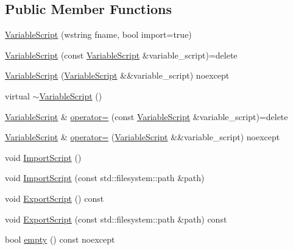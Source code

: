 \subsection*{Public Member Functions}
\begin{DoxyCompactItemize}
\item 
\mbox{\hyperlink{classmage_1_1_variable_script_a87830f09a97aa8f7df3074029c5ab8d5}{Variable\+Script}} (wstring fname, bool import=true)
\item 
\mbox{\hyperlink{classmage_1_1_variable_script_aebd4e6cf2bdae4e57c9da428007fc4d7}{Variable\+Script}} (const \mbox{\hyperlink{classmage_1_1_variable_script}{Variable\+Script}} \&variable\+\_\+script)=delete
\item 
\mbox{\hyperlink{classmage_1_1_variable_script_ac29cca638a32bccae00a9e53404158d5}{Variable\+Script}} (\mbox{\hyperlink{classmage_1_1_variable_script}{Variable\+Script}} \&\&variable\+\_\+script) noexcept
\item 
virtual \mbox{\hyperlink{classmage_1_1_variable_script_ae7026e1283b1a1164f02fdc3e1f2b829}{$\sim$\+Variable\+Script}} ()
\item 
\mbox{\hyperlink{classmage_1_1_variable_script}{Variable\+Script}} \& \mbox{\hyperlink{classmage_1_1_variable_script_ae090b066ea939fc6611e77a47df6a97f}{operator=}} (const \mbox{\hyperlink{classmage_1_1_variable_script}{Variable\+Script}} \&variable\+\_\+script)=delete
\item 
\mbox{\hyperlink{classmage_1_1_variable_script}{Variable\+Script}} \& \mbox{\hyperlink{classmage_1_1_variable_script_a7cb6a585a701268aaac38d8f039fc403}{operator=}} (\mbox{\hyperlink{classmage_1_1_variable_script}{Variable\+Script}} \&\&variable\+\_\+script) noexcept
\item 
void \mbox{\hyperlink{classmage_1_1_variable_script_a5f1cc3bfb611edbc8dfb433ec55cc965}{Import\+Script}} ()
\item 
void \mbox{\hyperlink{classmage_1_1_variable_script_aea1a4abf7c439897b9ac332896709c93}{Import\+Script}} (const std\+::filesystem\+::path \&path)
\item 
void \mbox{\hyperlink{classmage_1_1_variable_script_ab12b7f789f6af2b301ff350fa401b324}{Export\+Script}} () const
\item 
void \mbox{\hyperlink{classmage_1_1_variable_script_aba954f58218794227f026d8e5d286da9}{Export\+Script}} (const std\+::filesystem\+::path \&path) const
\item 
bool \mbox{\hyperlink{classmage_1_1_variable_script_a8a3f47783455cd6264dfc996887fd0f0}{empty}} () const noexcept

\end{DoxyCompactItemize}
